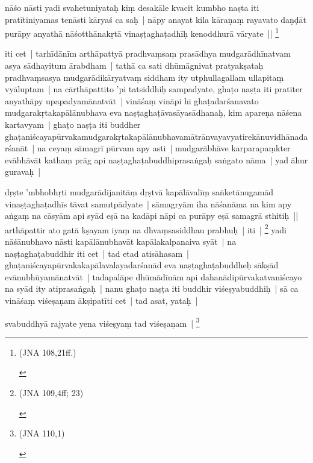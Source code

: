 \documentclass[article,12pt,a4paper]{memoir}
\begin{document}
	  \pstart nāśo nāsti yadi svahetuniyataḥ kiṃ desakāle kvacit kumbho naṣta iti pratītiniyamas tenāsti kāryaś ca saḥ | nāpy anayat kila kāraṇaṃ rayavato daṇḍāt purāpy anyathā nāśotthānakṛtā vinaṣṭaghaṭadhīḥ kenoddhurā vāryate || \footnote{\begin{english}(JNA 108,21ff.)\end{english}}
	\pend
      

	  \pstart iti cet | \label{thakur75-119.23} tarhīdānīm arthāpattyā pradhvaṃsaṃ prasādhya mudgarādhīnatvam asya sādhayitum ārabdham | tathā ca sati dhūmāgnivat pratyakṣataḥ pradhvaṃsasya mudgarādikāryatvaṃ siddham ity utphullagallam ullapitaṃ vyāluptam | \label{thakur75-119.26} na cārthāpattito 'pi tatsiddhiḥ sampadyate, ghaṭo naṣṭa iti pratīter anyathāpy upapadyamānatvāt | vināśaṃ vināpi hi ghaṭadarśanavato mudgarakṛtakapālānubhava eva naṣṭaghaṭāvasāyasādhanaḥ, kim apareṇa nāśena kartavyam | ghaṭo naṣṭa iti buddher ghaṭaniścayapūrvakamudgarakṛtakapālānubhavamātrānvayavyatirekānuvidhānadarśanāt | \label{thakur75-119.29} na ceyaṃ sāmagrī pūrvam apy asti | mudgarābhāve karparapaṃkter evābhāvāt kathaṃ prāg api naṣṭaghaṭabuddhiprasaṅgaḥ saṅgato nāma | \label{thakur75-119.31} yad āhur guravaḥ |
	\pend
      

	  \pstart dṛṣte 'mbhobhṛti mudgarādijanitāṃ dṛṣtvā kapālāvalīṃ saṅketānugamād vinaṣṭaghaṭadhīs tāvat samutpādyate | sāmagryām iha nāśanāma na kim apy aṅgaṃ na cāsyām api syād eṣā na kadāpi nāpi ca purāpy eṣā samagrā sthitiḥ || arthāpattir ato gatā kṣayam iyaṃ na dhvaṃsasiddhau prabhuḥ | iti | \footnote{\begin{english}(JNA 109,4ff; 23)\end{english}} \label{thakur75-120.4} yadi nāśānubhavo nāsti kapālānubhavāt kapālakalpanaiva syāt | na naṣṭaghaṭabuddhir iti cet | \label{thakur75-120.5} tad etad atisāhasam | ghaṭaniścayapūrvakakapālavalayadarśanād eva naṣṭaghaṭabuddheḥ sākṣād evānubhūyamānatvāt | tadapalāpe dhūmādīnām api dahanādipūrvakatvaniścayo na syād ity atiprasaṅgaḥ | \label{thakur75-120.8} nanu ghaṭo naṣṭa iti buddhir viśeṣyabuddhiḥ | sā ca vināśaṃ viśeṣaṇam ākṣipatīti cet | \label{thakur75-120.9} tad asat, yataḥ |
	\pend
      

	  \pstart svabuddhyā rajyate yena viśeṣyaṃ tad viśeṣaṇam | \footnote{\begin{english}(JNA 110,1)\end{english}}
	\pend
      
\end{document}
